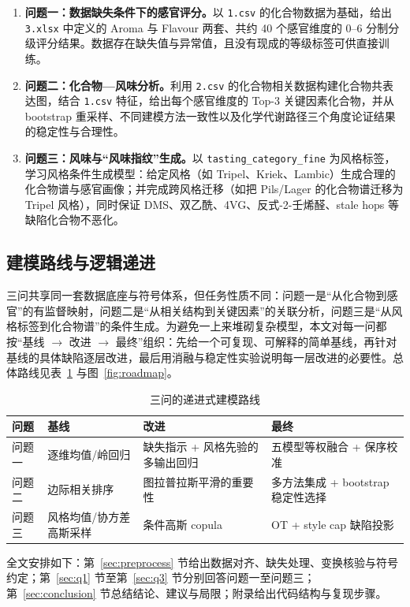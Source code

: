 \begin{enumerate}
  \item \textbf{问题一：数据缺失条件下的感官评分。}以 \texttt{1.csv} 的化合物数据为基础，给出 \texttt{3.xlsx} 中定义的 Aroma 与 Flavour 两套、共约 40 个感官维度的 0--6 分制分级评分结果。数据存在缺失值与异常值，且没有现成的等级标签可供直接训练。
  \item \textbf{问题二：化合物—风味分析。}利用 \texttt{2.csv} 的化合物相关数据构建化合物共表达图，结合 \texttt{1.csv} 特征，给出每个感官维度的 Top-3 关键因素化合物，并从 bootstrap 重采样、不同建模方法一致性以及化学代谢路径三个角度论证结果的稳定性与合理性。
  \item \textbf{问题三：风味与“风味指纹”生成。}以 \texttt{tasting\_category\_fine} 为风格标签，学习风格条件生成模型：给定风格（如 Tripel、Kriek、Lambic）生成合理的化合物谱与感官画像；并完成跨风格迁移（如把 Pils/Lager 的化合物谱迁移为 Tripel 风格），同时保证 DMS、双乙酰、4VG、反式-2-壬烯醛、stale hops 等缺陷化合物不恶化。
\end{enumerate}

\subsection{建模路线与逻辑递进}

三问共享同一套数据底座与符号体系，但任务性质不同：问题一是“从化合物到感官”的有监督映射，问题二是“从相关结构到关键因素”的关联分析，问题三是“从风格标签到化合物谱”的条件生成。为避免一上来堆砌复杂模型，本文对每一问都按“基线 $\rightarrow$ 改进 $\rightarrow$ 最终”组织：先给一个可复现、可解释的简单基线，再针对基线的具体缺陷逐层改进，最后用消融与稳定性实验说明每一层改进的必要性。总体路线见表~\ref{tab:roadmap} 与图~\ref{fig:roadmap}。

\begin{table}[htbp]
  \centering
  \caption{三问的递进式建模路线}
  \label{tab:roadmap}
  \small
  \begin{tabularx}{\textwidth}{@{}l X X X@{}}
    \toprule
    问题 & 基线 & 改进 & 最终 \\
    \midrule
    问题一 & 逐维均值/岭回归 & 缺失指示 + 风格先验的多输出回归 & 五模型等权融合 + 保序校准 \\
    问题二 & 边际相关排序 & 图拉普拉斯平滑的重要性 & 多方法集成 + bootstrap 稳定性选择 \\
    问题三 & 风格均值/协方差高斯采样 & 条件高斯 copula & OT + style cap 缺陷投影 \\
    \bottomrule
  \end{tabularx}
\end{table}


全文安排如下：第~\ref{sec:preprocess} 节给出数据对齐、缺失处理、变换核验与符号约定；第~\ref{sec:q1} 节至第~\ref{sec:q3} 节分别回答问题一至问题三；第~\ref{sec:conclusion} 节总结结论、建议与局限；附录给出代码结构与复现步骤。
